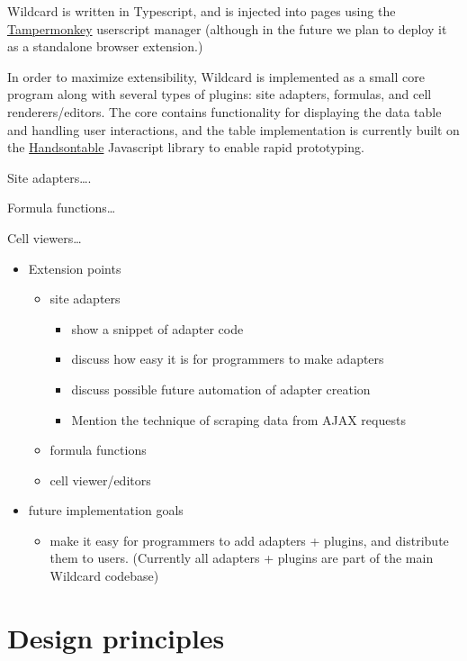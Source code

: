 \documentclass[english,submission]{programming}
\providecommand{\tightlist}{%
  \setlength{\itemsep}{0pt}\setlength{\parskip}{0pt}}
\begin{document}
Wildcard is written in Typescript, and is injected into pages using the
\href{https://www.tampermonkey.net/}{Tampermonkey} userscript manager
(although in the future we plan to deploy it as a standalone browser
extension.)

In order to maximize extensibility, Wildcard is implemented as a small
core program along with several types of plugins: site adapters,
formulas, and cell renderers/editors. The core contains functionality
for displaying the data table and handling user interactions, and the
table implementation is currently built on the
\href{https://handsontable.com/}{Handsontable} Javascript library to
enable rapid prototyping.

Site adapters\ldots.

Formula functions\ldots{}

Cell viewers\ldots{}

\begin{itemize}
\tightlist
\item
  Extension points

  \begin{itemize}
  \tightlist
  \item
    site adapters

    \begin{itemize}
    \tightlist
    \item
      show a snippet of adapter code
    \item
      discuss how easy it is for programmers to make adapters
    \item
      discuss possible future automation of adapter creation
    \item
      Mention the technique of scraping data from AJAX requests
    \end{itemize}
  \item
    formula functions
  \item
    cell viewer/editors
  \end{itemize}
\item
  future implementation goals

  \begin{itemize}
  \tightlist
  \item
    make it easy for programmers to add adapters + plugins, and
    distribute them to users. (Currently all adapters + plugins are part
    of the main Wildcard codebase)
  \end{itemize}
\end{itemize}

\hypertarget{design-principles}{%
\section{Design principles}\label{design-principles}}
\end{document}
